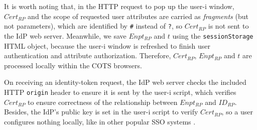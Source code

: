 It is worth noting that,
in the HTTP request to pop up the user-i window, $Cert_{RP}$ and the scope of requested user attributes are carried as \emph{fragments} (but not parameters), which are identified by \texttt{\#} instead of \texttt{?},
    so $Cert_{RP}$ is not sent to the IdP web server.
Meanwhile, we save $Enpt_{RP}$ and $t$ using the \verb+sessionStorage+ HTML object,
    because the user-i window is refreshed to finish user authentication and attribute authorization.
Therefore, $Cert_{RP}$, $Enpt_{RP}$ and $t$ are processed locally within the COTS browsers.

On receiving an identity-token request, the IdP web server checks the included HTTP \texttt{origin} header to ensure it is sent by the user-i script,
which verifies $Cert_{RP}$ to ensure correctness of the relationship between $Enpt_{RP}$ and $ID_{RP}$.
Besides,
the IdP's public key is set in the user-i script to verify $Cert_{RP}$,
so a user configures nothing locally,
 like in other popular SSO systems \cite{OpenIDConnect, rfc6749, SAML, SAMLIdentifier}.


